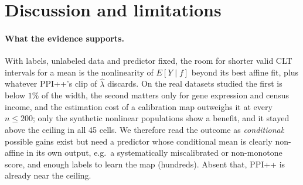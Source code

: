 \section{Discussion and limitations}
\label{sec:discussion}
\paragraph{What the evidence supports.} With labels, unlabeled data and predictor fixed, the room for shorter valid CLT intervals for a mean is the nonlinearity of $E[Y\mid f]$ beyond its best affine fit, plus whatever PPI++'s clip of $\hat\lambda$ discards. On the real datasets studied the first is below $1\%$ of the width, the second matters only for gene expression and census income, and the estimation cost of a calibration map outweighs it at every $n\le200$; only the synthetic nonlinear populations show a benefit, and it stayed above the ceiling in all 45 cells. We therefore read the outcome as \emph{conditional}: possible gains exist but need a predictor whose conditional mean is clearly non-affine in its own output, e.g.\ a systematically miscalibrated or non-monotone score, and enough labels to learn the map (hundreds). Absent that, PPI++ is already near the ceiling.

